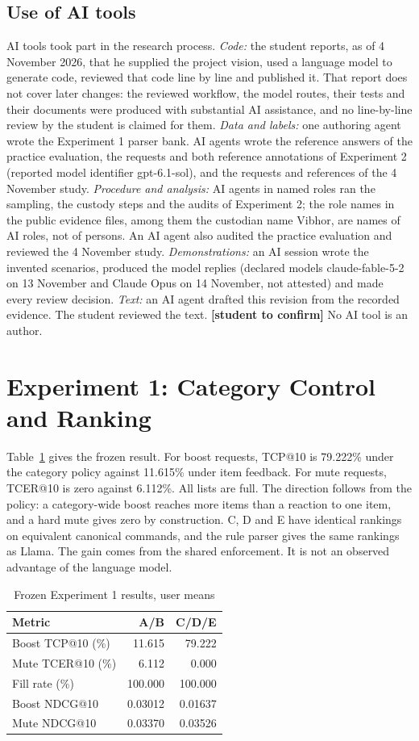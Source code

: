 \documentclass[conference]{IEEEtran}
\newcommand{\StudentConfirm}[1]{#1 \textbf{[student to confirm]}}
\begin{document}
\subsection{Use of AI tools}\label{sec:ai}
AI tools took part in the research process. \emph{Code:} the student reports, as of 4 November 2026, that he supplied the project vision, used a language model to generate code, reviewed that code line by line and published it. That report does not cover later changes: the reviewed workflow, the model routes, their tests and their documents were produced with substantial AI assistance, and no line-by-line review by the student is claimed for them. \emph{Data and labels:} one authoring agent wrote the Experiment 1 parser bank. AI agents wrote the reference answers of the practice evaluation, the requests and both reference annotations of Experiment 2 (reported model identifier gpt-6.1-sol), and the requests and references of the 4 November study. \emph{Procedure and analysis:} AI agents in named roles ran the sampling, the custody steps and the audits of Experiment 2; the role names in the public evidence files, among them the custodian name Vibhor, are names of AI roles, not of persons. An AI agent also audited the practice evaluation and reviewed the 4 November study. \emph{Demonstrations:} an AI session wrote the invented scenarios, produced the model replies (declared models claude-fable-5-2 on 13 November and Claude Opus on 14 November, not attested) and made every review decision. \emph{Text:} an AI agent drafted this revision from the recorded evidence. \StudentConfirm{The student reviewed the text.} No AI tool is an author.

\section{Experiment 1: Category Control and Ranking}
Table~\ref{tab:e1} gives the frozen result. For boost requests, TCP@10 is 79.222\% under the category policy against 11.615\% under item feedback. For mute requests, TCER@10 is zero against 6.112\%. All lists are full. The direction follows from the policy: a category-wide boost reaches more items than a reaction to one item, and a hard mute gives zero by construction. C, D and E have identical rankings on equivalent canonical commands, and the rule parser gives the same rankings as Llama. The gain comes from the shared enforcement. It is not an observed advantage of the language model.

\begin{table}[t]\centering\footnotesize
\caption{Frozen Experiment 1 results, user means}\label{tab:e1}
\begin{tabular}{lrr}\toprule
Metric & A/B & C/D/E\\\midrule
Boost TCP@10 (\%) &11.615&79.222\\
Mute TCER@10 (\%) &6.112&0.000\\
Fill rate (\%) &100.000&100.000\\
Boost NDCG@10 &0.03012&0.01637\\
Mute NDCG@10 &0.03370&0.03526\\\bottomrule
\end{tabular}\end{table}
\end{document}
